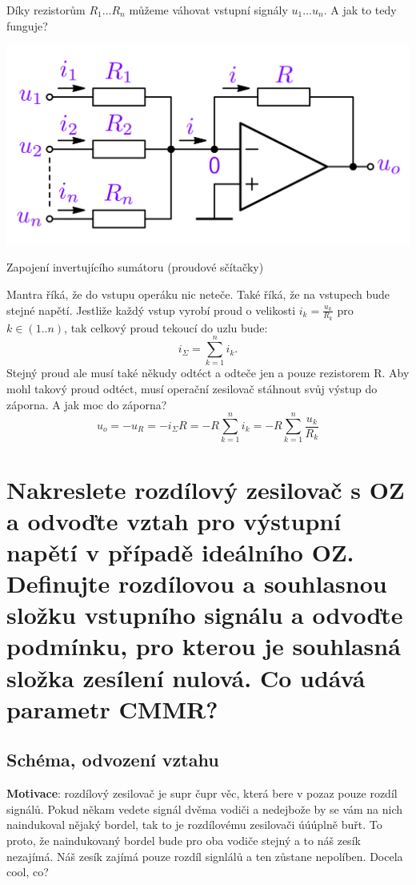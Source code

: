 \documentclass[a4paper,12pt]{article}   %
\begin{document}
Díky rezistorům $R_1 ... R_n$ můžeme váhovat vstupní signály $u_1 ... u_n$. A jak to tedy funguje?

\begin{schema}[h!]
    \centering
    \includegraphics[width=.6\textwidth]{invert-sumator.PNG}
    \caption{Zapojení invertujícího sumátoru (proudové sčítačky)}
    \label{sch:sumator}
\end{schema}

Mantra říká, že do vstupu operáku nic neteče. Také říká, že na vstupech bude stejné napětí. Jestliže každý vstup vyrobí proud o velikosti $i_k = \frac{u_k}{R_k}$ pro $k\in (1..n)$, tak celkový proud tekoucí do uzlu bude:
\begin{equation*}
    i_\Sigma=\sum_{k=1}^n i_k.
\end{equation*}
Stejný proud ale musí také někudy odtéct a odteče jen a pouze rezistorem R. Aby mohl takový proud odtéct, musí operační zesilovač stáhnout svůj výstup do záporna. A jak moc do záporna?
\begin{equation}
    u_o = -u_R = -i_\Sigma R = -R \sum_{k=1}^n i_k = -R \sum_{k=1}^n \frac{u_k}{R_k}
\end{equation}









\section{Nakreslete rozdílový zesilovač s OZ a odvoďte vztah pro výstupní napětí v případě ideálního OZ. Definujte rozdílovou a souhlasnou složku vstupního signálu a odvoďte podmínku, pro kterou je souhlasná složka zesílení nulová. Co udává parametr CMMR?}
\subsection*{Schéma, odvození vztahu}
\textbf{Motivace}: rozdílový zesilovač je supr čupr věc, která bere v pozaz pouze rozdíl signálů. Pokud někam vedete signál dvěma vodiči a nedejbože by se vám na nich naindukoval nějaký bordel, tak to je rozdílovému zesilovači úúúplně buřt. To proto, že naindukovaný bordel bude pro oba vodiče stejný a to náš zesík nezajímá. Náš zesík zajímá pouze rozdíl signlálů a ten zůstane nepolíben. Docela cool, co?
\end{document}
